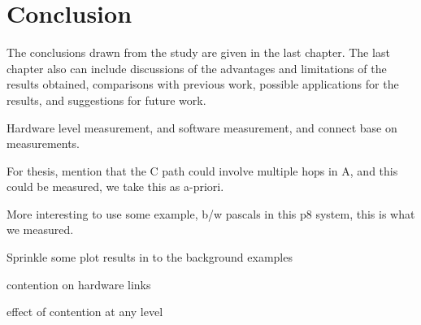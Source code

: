 \chapter{Conclusion}
\label{ch:conclusion}

The conclusions drawn from the study are given in the last chapter.
The last chapter also can include discussions of the advantages and limitations of the results obtained, comparisons with previous work, possible applications for the results, and suggestions for future work.



Hardware level measurement, and software measurement, and connect base on measurements.

For thesis, mention that the C path could involve multiple hops in A, and this could be measured, we take this as a-priori.

More interesting to use some example, b/w pascals in this p8 system, this is what we measured.

Sprinkle some plot results in to the background examples

contention on hardware links

effect of contention at any level





